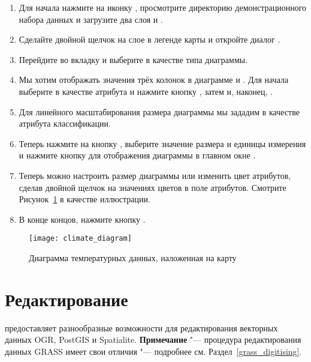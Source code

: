 \begin{enumerate}
\item Для начала нажмите на иконку ,
просмотрите директорию демонстрационного набора данных \qg и загрузите два слоя
 и .
\item Сделайте двойной щелчок на слое  в легенде карты
и откройте диалог .
\item Перейдите во вкладку  и выберите
 в качестве типа диаграммы.
\item Мы хотим отображать значения трёх колонок в диаграмме
 и . Для начала выберите
 в качестве атрибута и нажмите кнопку ,
затем  и, наконец, .
\item Для линейного масштабирования размера диаграммы мы зададим 
в качестве атрибута классификации.
\item Теперь нажмите на кнопку , выберите
значение размера и единицы измерения и нажмите кнопку  для
отображения диаграммы в главном окне \qg.
\item Теперь можно настроить размер диаграммы или изменить цвет атрибутов,
сделав двойной щелчок на значениях цветов в поле атрибутов. Смотрите
Рисунок~\ref{fig:climatediagram} в качестве иллюстрации.
\item В конце концов, нажмите кнопку .
\end{enumerate}

\begin{figure}[ht]
   \centering
   \texttt{[image: climate\_diagram]}
   \caption{Диаграмма температурных данных, наложенная на карту \wincaption}\label{fig:climatediagram}
\end{figure}

\section{Редактирование}

\qg предоставляет разнообразные возможности для редактирования векторных
данных OGR, PostGIS и Spatialite. \textbf{Примечание} "--- процедура
редактирования данных GRASS имеет свои отличия "--- подробнее см.
Раздел~\ref{grass_digitising}.

